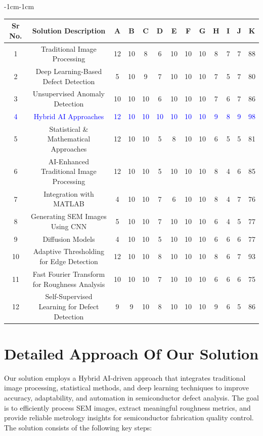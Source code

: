 \documentclass[12pt,oneside,letterpaper,english]{article}
\begin{document}
\vspace{1cm}
\renewcommand{\arraystretch}{1.5} %
\begin{adjustwidth}{-1cm}{-1cm} %
\begin{tabular}{|c|c|c|c|c|c|c|c|c|c|c|c|c|}
	\hline
	Sr No. & Solution Description & A & B & C & D & E & F & G & H & I & J & K\\
	\hline
	1 & Traditional Image Processing & 12 & 10 & 8 & 6 & 10 & 10 & 10 & 8 & 7 & 7 & 88\\
	\hline
	2 & Deep Learning-Based Defect Detection & 5 & 10 & 9 & 7 & 10 & 10 & 10 & 7 & 5 & 7 & 80\\
	\hline
	3 & Unsupervised Anomaly Detection & 10 & 10 & 10 & 6 & 10 & 10 & 10 & 7 & 6 & 7 & 86\\
	\hline
	\textcolor{blue}{4} & \textcolor{blue}{Hybrid AI Approaches}& \textcolor{blue}{12} & \textcolor{blue}{10} & \textcolor{blue}{10} & \textcolor{blue}{10} & \textcolor{blue}{10} & \textcolor{blue}{10} & \textcolor{blue}{10} & \textcolor{blue}{9} & \textcolor{blue}{8} & \textcolor{blue}{9} & \textcolor{blue}{98}\\
	\hline
	5 & Statistical \& Mathematical Approaches & 12 & 10 & 10 & 5 & 8 & 10 & 10 & 6 & 5 & 5 & 81\\
	\hline
	6 & AI-Enhanced Traditional Image Processing & 12 & 10 & 10 & 5 & 10 & 10 & 10 & 8 & 4 & 6 & 85\\
	\hline
	7 & Integration with MATLAB & 4 & 10 & 10 & 7 & 6 & 10 & 10 & 8 & 4 & 7 & 76\\
	\hline
	8 & Generating SEM Images Using CNN & 5 & 10 & 10 & 7 & 10 & 10 & 10 & 6 & 4 & 5 & 77\\
	\hline
	9 & Diffusion Models & 4 & 10 & 10 & 5 & 10 & 10 & 10 & 6 & 6 & 6 & 77\\
	\hline
	10 &  Adaptive Thresholding for Edge Detection & 12 & 10 & 10 & 8 & 10 & 10 & 10 & 8 & 6 & 7 & 93\\
	\hline
	11 & Fast Fourier Transform for Roughness Analysis&10 & 10 & 10 & 7 & 10 & 10 & 10 & 6 & 6 & 6 & 75\\
	\hline
	12 & Self-Supervised Learning for Defect Detection & 9 & 9 & 10 & 8 & 10 & 10 & 10 & 9 & 6 & 5 & 86\\
	\hline
\end{tabular}
\end{adjustwidth}

\newpage
\section{Detailed Approach Of Our Solution}
Our solution employs a Hybrid AI-driven approach that integrates traditional image processing, statistical methods, and deep learning techniques to improve accuracy, adaptability, and automation in semiconductor defect analysis. The goal is to efficiently process SEM images, extract meaningful roughness metrics, and provide reliable metrology insights for semiconductor fabrication quality control. The solution consists of the following key steps:\\
\end{document}
